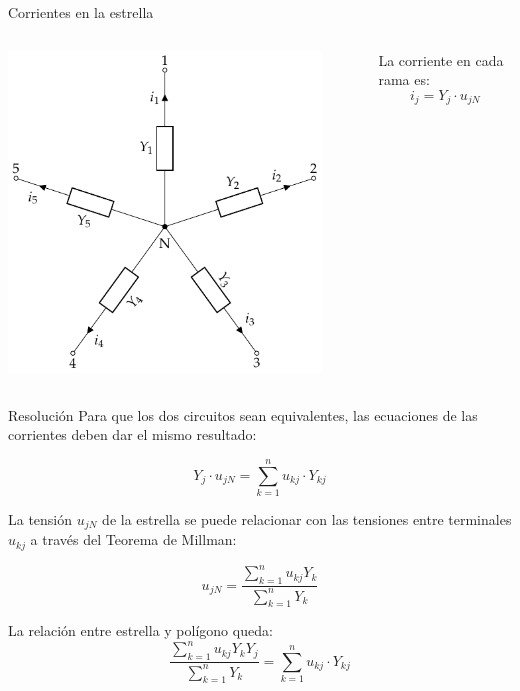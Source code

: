 \documentclass[aspectratio=169, usenames,svgnames,dvipsnames]{beamer}
\begin{document}
\begin{frame}[label={sec:orgd642566}]{Corrientes en la estrella}
\begin{columns}
\begin{column}{0.5\columnwidth}
\begin{center}
\includegraphics[width=0.9\textwidth]{../figs/Rosen_Y.pdf}
\end{center}
\end{column}

\begin{column}{0.5\columnwidth}
La corriente en cada rama es:
\[
  i_j = Y_j \cdot u_{jN}
\]
\end{column}
\end{columns}
\end{frame}

\begin{frame}[label={sec:org3f5740a}]{Resolución}
Para que los dos circuitos sean equivalentes, las ecuaciones de las corrientes deben dar el mismo resultado:

\[
  Y_j \cdot u_{jN} = \sum_{k = 1}^n u_{kj} \cdot Y_{kj}  
\]

La tensión \(u_{jN}\) de la estrella se puede relacionar con las tensiones entre terminales \(u_{kj}\) a través del Teorema de Millman:

\[
  u_{jN} = \frac{\sum_{k = 1}^n u_{kj} Y_k}{\sum_{k  = 1}^n Y_k}
\]

La relación entre estrella y polígono queda:
\[
  \frac{\sum_{k = 1}^n u_{kj} Y_k Y_j}{\sum_{k  = 1}^n Y_k} = \sum_{k = 1}^n u_{kj} \cdot Y_{kj}  
\]
\end{frame}
\end{document}
